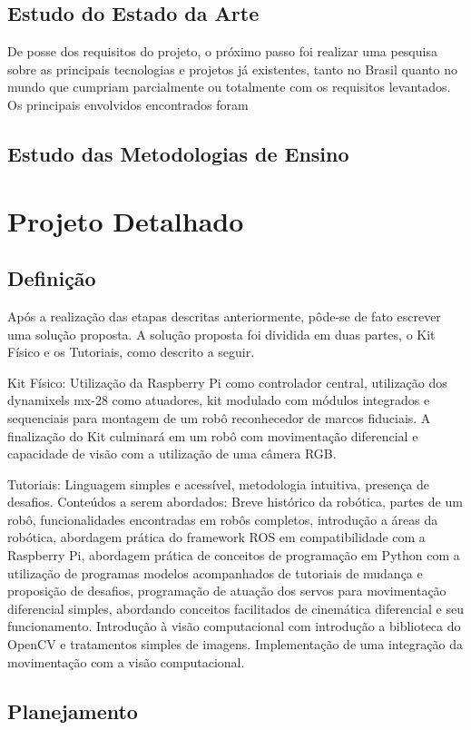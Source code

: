 \subsection{Estudo do Estado da Arte}
De posse dos requisitos do projeto, o próximo passo foi realizar uma pesquisa sobre as principais tecnologias e projetos já existentes, tanto no Brasil quanto no mundo que cumpriam parcialmente ou totalmente com os requisitos levantados. Os principais envolvidos encontrados foram 
\subsection{Estudo das Metodologias de Ensino}

\section{Projeto Detalhado}
\subsection{Definição}
Após a realização das etapas descritas anteriormente, pôde-se de fato escrever uma solução proposta. A solução proposta foi dividida em duas partes, o Kit Físico e os Tutoriais, como descrito a seguir.

Kit Físico: Utilização da Raspberry Pi como controlador central, utilização dos dynamixels mx-28 como atuadores, kit modulado com módulos integrados e sequenciais para montagem de um robô reconhecedor de marcos fiduciais. A finalização do Kit culminará em um robô com movimentação diferencial e capacidade de visão com a utilização de uma câmera RGB.

Tutoriais: Linguagem simples e acessível, metodologia intuitiva, presença de desafios.
Conteúdos a serem abordados: Breve histórico da robótica, partes de um robô, funcionalidades encontradas em robôs completos, introdução a áreas da robótica, abordagem prática do framework ROS em compatibilidade com a Raspberry Pi, abordagem prática de conceitos de programação em Python com a utilização de programas modelos acompanhados de tutoriais de mudança e proposição de desafios,
programação de atuação dos servos para movimentação diferencial simples, abordando conceitos facilitados de cinemática diferencial e seu funcionamento. Introdução à visão computacional com introdução a biblioteca do OpenCV e tratamentos simples de imagens.
Implementação de uma integração da movimentação com a visão computacional.
\subsection{Planejamento}

